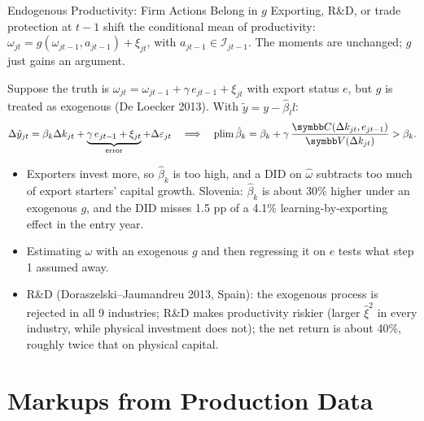 \documentclass[aspectratio=169,10pt]{beamer}
\begin{document}
\begin{frame}{Endogenous Productivity: Firm Actions Belong in $g$}
\small
Exporting, R\&D, or trade protection at $t-1$ shift the conditional mean of productivity: $\omega_{jt} = g(\omega_{jt-1}, a_{jt-1}) + \xi_{jt}$, with $a_{jt-1} \in \mathcal{I}_{jt-1}$. The moments are unchanged; $g$ just gains an argument.

Suppose the truth is $\omega_{jt} = \omega_{jt-1} + \gamma\, e_{jt-1} + \xi_{jt}$ with export status $e$, but $g$ is treated as exogenous (De Loecker 2013). With $\tilde y = y - \hat\beta_l l$:
\begin{align*}
\Delta\tilde y_{jt} = \beta_k \Delta k_{jt} + \underbrace{\gamma\, e_{jt-1} + \xi_{jt}}_{\text{error}} + \Delta\varepsilon_{jt}
\quad\Longrightarrow\quad
\operatorname{plim} \hat\beta_k = \beta_k + \gamma\,\frac{\Cov(\Delta k_{jt}, e_{jt-1})}{\Var(\Delta k_{jt})} > \beta_k.
\end{align*}
\begin{itemize}
\item Exporters invest more, so $\hat\beta_k$ is too high, and a DID on $\hat\omega$ subtracts too much of export starters' capital growth. Slovenia: $\hat\beta_k$ is about 30\% higher under an exogenous $g$, and the DID misses 1.5 pp of a 4.1\% learning-by-exporting effect in the entry year.
\item Estimating $\hat\omega$ with an exogenous $g$ and then regressing it on $e$ tests what step 1 assumed away.
\item \alert{R\&D} (Doraszelski--Jaumandreu 2013, Spain): the exogenous process is rejected in all 9 industries; R\&D makes productivity riskier (larger $\hat\xi^2$ in every industry, while physical investment does not); the net return is about 40\%, roughly twice that on physical capital.
\end{itemize}
\end{frame}


\section{Markups from Production Data}
\end{document}

